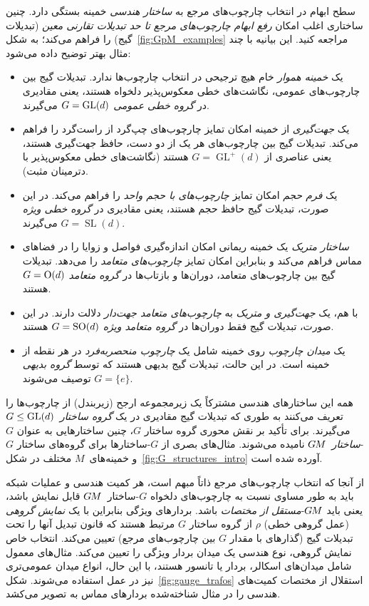 سطح ابهام در انتخاب چارچوب‌های مرجع به \emph{ساختار هندسی} خمینه بستگی دارد.
چنین ساختاری اغلب امکان
\emph{رفع ابهام چارچوب‌های مرجع تا حد تبدیلات تقارنی معین} (تبدیلات گیج) را فراهم می‌کند؛ به شکل~\ref{fig:GpM_examples} مراجعه کنید.
این بیانیه با چند مثال بهتر توضیح داده می‌شود:
\begin{itemize}[leftmargin=1.2cm]
	\item[{\rule[2.2pt]{2pt}{2pt}}]
	یک \emph{خمینه هموار} خام هیچ ترجیحی در انتخاب چارچوب‌ها ندارد.
	تبدیلات گیج بین چارچوب‌های عمومی، نگاشت‌های خطی معکوس‌پذیر دلخواه هستند، یعنی مقادیری در \emph{گروه خطی عمومی} ${G=\operatorname{GL}(d)}$ می‌گیرند.
	\item[{\rule[2.2pt]{2pt}{2pt}}]
	یک \emph{جهت‌گیری} از خمینه امکان تمایز چارچوب‌های چپ‌گرد از راست‌گرد را فراهم می‌کند.
	تبدیلات گیج بین چارچوب‌های هر یک از دو دست، حافظ جهت‌گیری هستند، یعنی عناصری از ${G=\operatorname{GL}^+(d)}$ هستند (نگاشت‌های خطی معکوس‌پذیر با دترمینان مثبت).
	\item[{\rule[2.2pt]{2pt}{2pt}}]
	یک \emph{فرم حجم} امکان تمایز \emph{چارچوب‌های با حجم واحد} را فراهم می‌کند.
	در این صورت، تبدیلات گیج حافظ حجم هستند، یعنی مقادیری در \emph{گروه خطی ویژه} $G=\operatorname{SL}(d)$ می‌گیرند.
	\item[{\rule[2.2pt]{2pt}{2pt}}]
	\emph{ساختار متریک} یک خمینه ریمانی امکان اندازه‌گیری فواصل و زوایا را در فضاهای مماس فراهم می‌کند و بنابراین امکان تمایز \emph{چارچوب‌های متعامد} را می‌دهد.
	تبدیلات گیج بین چارچوب‌های متعامد، دوران‌ها و بازتاب‌ها در \emph{گروه متعامد} $G=\operatorname{O}(d)$ هستند.
	\item[{\rule[2.2pt]{2pt}{2pt}}]
	با هم، یک \emph{جهت‌گیری و متریک} به \emph{چارچوب‌های متعامد جهت‌دار} دلالت دارند.
	در این صورت، تبدیلات گیج فقط دوران‌ها در \emph{گروه متعامد ویژه} $G=\operatorname{SO}(d)$ هستند.
	\item[{\rule[2.2pt]{2pt}{2pt}}]
	یک \emph{میدان چارچوب} روی خمینه شامل یک \emph{چارچوب منحصربه‌فرد} در هر نقطه از خمینه است.
	در این حالت، تبدیلات گیج بدیهی هستند که توسط \emph{گروه بدیهی} $G=\{e\}$ توصیف می‌شوند.
\end{itemize}
همه این ساختارهای هندسی مشترکاً یک زیرمجموعه ارجح (زیربندل) از چارچوب‌ها را تعریف می‌کنند به طوری که تبدیلات گیج مقادیری در یک \emph{گروه ساختار}~$G\leq\operatorname{GL}(d)$ می‌گیرند.
برای تأکید بر نقش محوری گروه ساختار $G$، چنین ساختارهایی به عنوان $G$-\emph{ساختار}~$G\mkern-1.4muM$ نامیده می‌شوند.
مثال‌های بصری از $G$-ساختارها برای گروه‌های ساختار $G$ و خمینه‌های~$M$ مختلف در شکل~\ref{fig:G_structures_intro} آورده شده است.


از آنجا که انتخاب چارچوب‌های مرجع ذاتاً مبهم است، هر کمیت هندسی و عملیات شبکه باید به طور مساوی نسبت به چارچوب‌های دلخواه $G$-ساختار~$G\mkern-1.4muM$ قابل نمایش باشد، یعنی باید $G\mkern-1.4muM$-\emph{مستقل از مختصات} باشد.
بردارهای ویژگی بنابراین با یک \emph{نمایش گروهی} (عمل گروهی خطی) $\rho$ از گروه ساختار $G$ مرتبط هستند که قانون تبدیل آنها را تحت تبدیلات گیج (گذار‌های با مقدار $G$ بین چارچوب‌های مرجع) تعیین می‌کند.
انتخاب خاص نمایش گروهی، نوع هندسی یک میدان بردار ویژگی را تعیین می‌کند.
مثال‌های معمول شامل میدان‌های اسکالر، بردار یا تانسور هستند، با این حال، انواع میدان عمومی‌تری نیز در عمل استفاده می‌شوند.
شکل~\ref{fig:gauge_trafos} استقلال از مختصات کمیت‌های هندسی را در مثال شناخته‌شده بردارهای مماس به تصویر می‌کشد.



